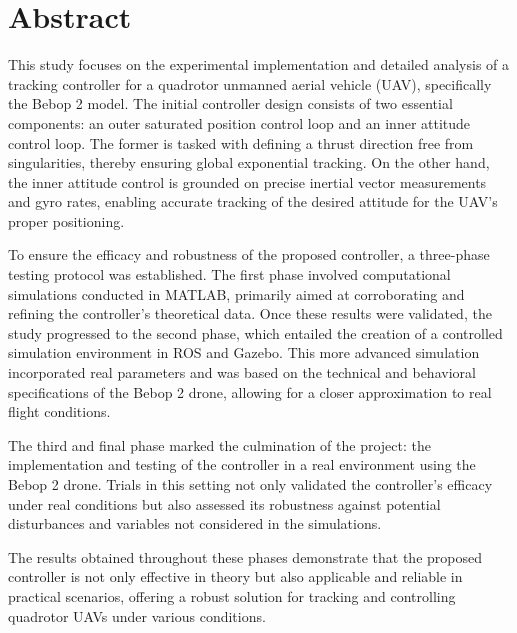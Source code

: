 \newpage
%
\chapter*{Abstract} 
This study focuses on the experimental implementation and detailed analysis of a tracking controller for a quadrotor unmanned aerial vehicle (UAV), specifically the Bebop 2 model. The initial controller design consists of two essential components: an outer saturated position control loop and an inner attitude control loop. The former is tasked with defining a thrust direction free from singularities, thereby ensuring global exponential tracking. On the other hand, the inner attitude control is grounded on precise inertial vector measurements and gyro rates, enabling accurate tracking of the desired attitude for the UAV's proper positioning.

To ensure the efficacy and robustness of the proposed controller, a three-phase testing protocol was established. The first phase involved computational simulations conducted in MATLAB, primarily aimed at corroborating and refining the controller's theoretical data. Once these results were validated, the study progressed to the second phase, which entailed the creation of a controlled simulation environment in ROS and Gazebo. This more advanced simulation incorporated real parameters and was based on the technical and behavioral specifications of the Bebop 2 drone, allowing for a closer approximation to real flight conditions.

The third and final phase marked the culmination of the project: the implementation and testing of the controller in a real environment using the Bebop 2 drone. Trials in this setting not only validated the controller's efficacy under real conditions but also assessed its robustness against potential disturbances and variables not considered in the simulations.

The results obtained throughout these phases demonstrate that the proposed controller is not only effective in theory but also applicable and reliable in practical scenarios, offering a robust solution for tracking and controlling quadrotor UAVs under various conditions.

\newpage
\thispagestyle{empty}
$\ $